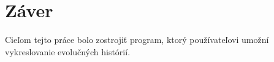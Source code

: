 \chapter*{Záver}

Cieľom tejto práce bolo zostrojiť program, ktorý používateľovi umožní vykreslovanie evolučných histórií.